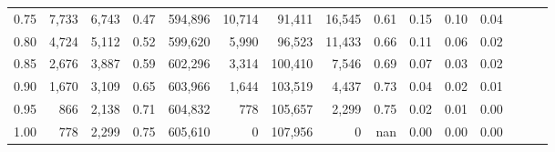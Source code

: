 \begin{tabular}{rrrrrrrrrrrrrrr}
0.75 &   7,733 &   6,743 &  0.47 &  594,896 &   10,714 &   91,411 &   16,545 &  0.61 &  0.15 &  0.10 &      0.04 \\
0.80 &   4,724 &   5,112 &  0.52 &  599,620 &    5,990 &   96,523 &   11,433 &  0.66 &  0.11 &  0.06 &      0.02 \\
0.85 &   2,676 &   3,887 &  0.59 &  602,296 &    3,314 &  100,410 &    7,546 &  0.69 &  0.07 &  0.03 &      0.02 \\
0.90 &   1,670 &   3,109 &  0.65 &  603,966 &    1,644 &  103,519 &    4,437 &  0.73 &  0.04 &  0.02 &      0.01 \\
0.95 &     866 &   2,138 &  0.71 &  604,832 &      778 &  105,657 &    2,299 &  0.75 &  0.02 &  0.01 &      0.00 \\
1.00 &     778 &   2,299 &  0.75 &  605,610 &        0 &  107,956 &        0 &   nan &  0.00 &  0.00 &      0.00 \\
\bottomrule
\end{tabular}
